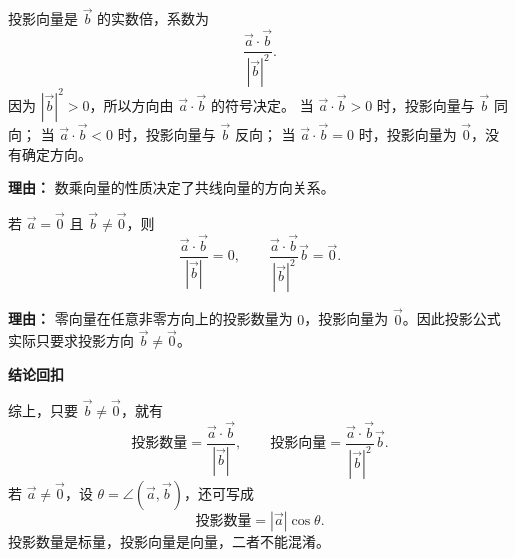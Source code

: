 \begin{proofbox}
\begin{description}[style=nextline, leftmargin=2.8em, labelsep=0.5em, itemsep=0.55em]
		\item[\textbf{步骤六（方向判断）：}] 投影向量是 $\vec{b}$ 的实数倍，系数为
		      \[
			      \frac{\vec{a}\cdot\vec{b}}{|\vec{b}|^2}.
		      \]
		      因为 $|\vec{b}|^2>0$，所以方向由 $\vec{a}\cdot\vec{b}$ 的符号决定。
		      当 $\vec{a}\cdot\vec{b}>0$ 时，投影向量与 $\vec{b}$ 同向；
		      当 $\vec{a}\cdot\vec{b}<0$ 时，投影向量与 $\vec{b}$ 反向；
		      当 $\vec{a}\cdot\vec{b}=0$ 时，投影向量为 $\vec{0}$，没有确定方向。
		      \par\textbf{理由：} 数乘向量的性质决定了共线向量的方向关系。

		\item[\textbf{步骤七（零向量补充）：}] 若 $\vec{a}=\vec{0}$ 且 $\vec{b}\ne\vec{0}$，则
		      \[
			      \frac{\vec{a}\cdot\vec{b}}{|\vec{b}|}=0,
			      \qquad
			      \frac{\vec{a}\cdot\vec{b}}{|\vec{b}|^2}\vec{b}=\vec{0}.
		      \]
		      \par\textbf{理由：} 零向量在任意非零方向上的投影数量为 $0$，投影向量为 $\vec{0}$。因此投影公式实际只要求投影方向 $\vec{b}\ne\vec{0}$。
	\end{description}

	\medskip
	\textbf{\textcolor{CProof}{结论回扣}}

	综上，只要 $\vec{b}\ne\vec{0}$，就有
	\[
		\text{投影数量}
		=
		\frac{\vec{a}\cdot\vec{b}}{|\vec{b}|},
		\qquad
		\text{投影向量}
		=
		\frac{\vec{a}\cdot\vec{b}}{|\vec{b}|^2}\vec{b}.
	\]
	若 $\vec{a}\ne\vec{0}$，设 $\theta=\angle(\vec{a},\vec{b})$，还可写成
	\[
		\text{投影数量}=|\vec{a}|\cos\theta.
	\]
	投影数量是标量，投影向量是向量，二者不能混淆。
\end{proofbox}